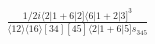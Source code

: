 \documentclass[varwidth, border=5pt]{standalone}
\begin{document}
\begin{my}
$\begin{gathered}
\scriptscriptstyle\frac{1/2i\langle2|1+6|2]\langle6|1+2|3]^3}{\langle12\rangle\langle16\rangle[34][45]\langle2|1+6|5]s_{345}}
\end{gathered}$
\end{my}
\end{document}
